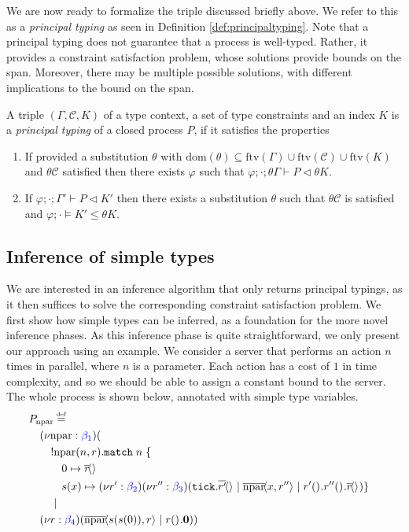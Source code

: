 %
We are now ready to formalize the triple discussed briefly above. We refer to this as a \textit{principal typing} as seen in Definition \ref{def:principaltyping}. Note that a principal typing does not guarantee that a process is well-typed. Rather, it provides a constraint satisfaction problem, whose solutions provide bounds on the span. Moreover, there may be multiple possible solutions, with different implications to the bound on the span.

\begin{defi}\label{def:principaltyping}
A triple $(\Gamma,\mathcal{C},K)$ of a type context, a set of type constraints and an index $K$ is a \textit{principal typing} of a closed process $P$, if it satisfies the properties
\begin{enumerate}
    \item If provided a substitution $\theta$ with $\text{dom}(\theta) \subseteq \text{ftv}(\Gamma) \cup \text{ftv}(\mathcal{C}) \cup \text{ftv}(K)$ and $\theta\mathcal{C}$ satisfied then there exists $\varphi$ such that $\varphi;\cdot;\theta\Gamma\vdash P \triangleleft \theta K$.
    \item If $\varphi;\cdot;\Gamma'\vdash P \triangleleft K'$ then there exists a substitution $\theta$ such that $\theta\mathcal{C}$ is satisfied and $\varphi;\cdot\vDash K' \leq \theta K$.
\end{enumerate}
\end{defi}
\subsection{Inference of simple types}\label{sec:simpletypeinf}
We are interested in an inference algorithm that only returns principal typings, as it then suffices to solve the corresponding constraint satisfaction problem. We first show how simple types can be inferred, as a foundation for the more novel inference phases. As this inference phase is quite straightforward, we only present our approach using an example. We consider a server that performs an action $n$ times in parallel, where $n$ is a parameter. Each action has a cost of $1$ in time complexity, and so we should be able to assign a constant bound to the server. The whole process is shown below, annotated with simple type variables.
\begin{align*}
    &\kern-1em P_{\text{npar}} \defeq\\
    &(\nu \text{npar} : {\color{blue} \beta_1})(\\
    &\kern1em !\text{npar}(n,r).\texttt{match}\; n\; \{\\
    &\kern2em 0 \mapsto \asyncoutputch{r}{}{}\\
    &\kern2em s(x) \mapsto (\nu r' : {\color{blue} \beta_2})(\nu r'' : {\color{blue} \beta_3})(\tick{\asyncoutputch{r'}{}{}} \mid
 \asyncoutputch{\text{npar}}{x,r''}{} \mid \inputch{r'}{}{}{\inputch{r''}{}{}{\asyncoutputch{r}{}{}}}) \} \\
    &\kern1em \mid \\
    &(\nu r : {\color{blue} \beta_4})( \asyncoutputch{\text{npar}}{s(s(0)),r}{} \mid \inputch{r}{}{}{\nil} ))
\end{align*}

